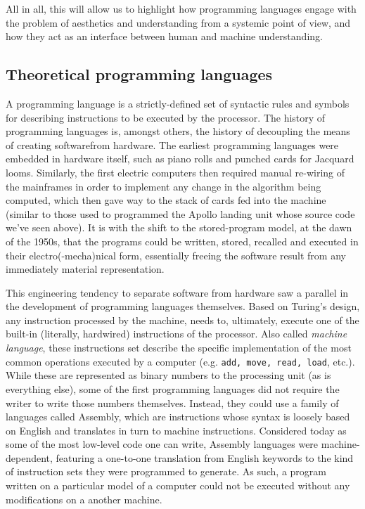 \documentclass{article}
\begin{document}
All in all, this will allow us to highlight how programming languages engage with the problem of aesthetics and understanding from a systemic point of view, and how they act as an interface between human and machine understanding.

\subsection{Theoretical programming languages}

A programming language is a strictly-defined set of syntactic rules and symbols for describing instructions to be executed by the processor. The history of programming languages is, amongst others, the history of decoupling the means of creating softwarefrom hardware. The earliest programming languages were embedded in hardware itself, such as piano rolls and punched cards for Jacquard looms. Similarly, the first electric computers then required manual re-wiring of the mainframes in order to implement any change in the algorithm being computed, which then gave way to the stack of cards fed into the machine (similar to those used to programmed the Apollo landing unit whose source code we've seen above). It is with the shift to the stored-program model, at the dawn of the 1950s, that the programs could be written, stored, recalled and executed in their electro(-mecha)nical form, essentially freeing the software result from any immediately material representation.

This engineering tendency to separate software from hardware saw a parallel in the development of programming languages themselves. Based on Turing's design, any instruction processed by the machine, needs to, ultimately, execute one of the built-in (literally, hardwired) instructions of the processor. Also called \emph{machine language}, these instructions set describe the specific implementation of the most common operations executed by a computer (e.g. \lstinline{add, move, read, load}, etc.). While these are represented as binary numbers to the processing unit (as is everything else), some of the first programming languages did not require the writer to write those numbers themselves. Instead, they could use a family of languages called Assembly, which are instructions whose syntax is loosely based on English and translates in turn to machine instructions. Considered today as some of the most low-level code one can write, Assembly languages were machine-dependent, featuring a one-to-one translation from English keywords to the kind of instruction sets they were programmed to generate. As such, a program written on a particular model of a computer could not be executed without any modifications on a another machine.
\end{document}
